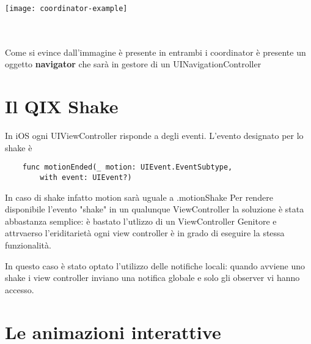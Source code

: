 \begin{minipage}{\linewidth}
    \centering
    \texttt{[image: coordinator-example]}
    \label{fig:5}
\end{minipage}\\ \\

Come si evince dall'immagine è presente in entrambi i coordinator è presente un oggetto
\textbf{navigator} che sarà in gestore di un UINavigationController

\section{Il QIX Shake}

In iOS ogni UIViewController risponde a degli eventi. L'evento designato per lo shake è
\begin{verbatim}
    func motionEnded(_ motion: UIEvent.EventSubtype,
        with event: UIEvent?)
\end{verbatim}

In caso di shake infatto motion sarà uguale a .motionShake
Per rendere disponibile l'evento "shake" in un qualunque ViewController la soluzione è stata abbastanza semplice:
è bastato l'utlizzo di un ViewController Genitore e attrvaerso l'eriditarietà ogni view controller è in grado
di eseguire la stessa funzionalità.

In questo caso è stato optato l'utilizzo delle notifiche locali: quando avviene uno shake i view controller inviano una notifica 
globale e solo gli observer vi hanno accesso.

\section{Le animazioni interattive}

